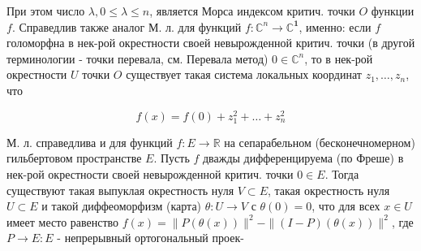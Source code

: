 \documentclass[10pt]{article}
\begin{document}
При этом число $\lambda, 0 \leqslant \lambda \leqslant n$, является Морса индексом критич. точки $O$ функции $f$. Справедлив также аналог М. л. для функций $f: \mathbb{C}^{n} \rightarrow \mathbb{C}^{\mathbf{1}}$, именно: если $f$ голоморфна в нек-рой окрестности своей невырожденной критич. точки (в другой терминологии - точки перевала, см. Перевала метод) $0 \in \mathbb{C}^{n}$, то в нек-рой окрестности $U$ точки $O$ существует такая система локальных координат $z_{1}, \ldots, z_{n}$, что



\[

f(x)=f(0)+z_{1}^{2}+\ldots+z_{n}^{2}

\]



М. л. справедлива и для функций $f: E \rightarrow \mathbb{R}$ на сепарабельном (бесконечномерном) гильбертовом пространстве $E$. Пусть $f$ дважды дифференцируема (по Фреше) в нек-рой окрестности своей невырожденной критич. точки $0 \in E$. Тогда существуют такая выпуклая окрестность нуля $V \subset E$, такая окрестность нуля $U \subset E$ и такой диффеоморфизм (карта) $\theta: U \rightarrow V$ с $\theta(0)=0$, что для всех $x \in U$ имеет место равенство $f(x)=\|P(\theta(x))\|^{2}-\|(I-P)(\theta(x))\|^{2}$, где $P \rightarrow E: E$ - непрерывный ортогональный проек-
\end{document}

